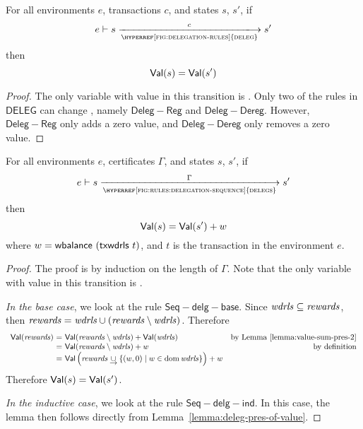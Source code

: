 \begin{lemma}
  \label{lemma:deleg-pres-of-value}
  For all environments $e$, transactions $c$, and states $s$, $s'$, if
  \begin{equation*}
    e\vdash s\trans{\hyperref[fig:delegation-rules]{deleg}}{c}s'
  \end{equation*}
  then
  \begin{equation*}
    \mathsf{Val}(s) = \mathsf{Val}(s')
  \end{equation*}
\end{lemma}

\begin{proof}
  The only variable with value in this transition is .
  Only two of the rules in $\mathsf{DELEG}$ can change ,
  namely $\mathsf{Deleg{-}Reg}$ and $\mathsf{Deleg{-}Dereg}$.
  However, $\mathsf{Deleg{-}Reg}$ only adds a zero value,
  and $\mathsf{Deleg{-}Dereg}$ only removes a zero value.
\end{proof}

\begin{lemma}
  \label{lemma:delegs-pres-of-value}
  For all environments $e$, certificates $\Gamma$, and states $s$, $s'$, if
  \begin{equation*}
    e\vdash s\trans{\hyperref[fig:rules:delegation-sequence]{delegs}}{\Gamma}s'
  \end{equation*}
  then
  \begin{equation*}
    \mathsf{Val}(s) = \mathsf{Val}(s') + w
  \end{equation*}
  where $w = \mathsf{wbalance}~(\mathsf{txwdrls}~{t})$,
  and $t$ is the transaction in the environment $e$.
\end{lemma}

\begin{proof}
  The proof is by induction on the length of $\Gamma$.
  Note that the only variable with value in this transition is .

  \vspace{2ex}
  \noindent
  \emph{In the base case}, we look at the rule $\mathsf{Seq{-}delg{-}base}$.
  Since $\mathit{wdrls}\subseteq\mathit{rewards}$, then
  $\mathit{rewards} = \mathit{wdrls}\cup\mathit{(\mathit{rewards}\setminus\mathit{wdrls})}$.
%
  Therefore
  \begin{equation*}
    \begin{array}{r@{~=~}lr}
      \Val{(\var{rewards})}
      & \Val{(\var{rewards}\setminus\var{wdrls})} + \Val{(\var{wdrls})}
      & \text{by Lemma~\ref{lemma:value-sum-pres-2}}
      \\
      & \Val{(\var{rewards}\setminus\var{wdrls})} + w
      & \text{by definition}
      \\
      & \Val\left(\var{rewards}\unionoverrideRight\{(w, 0) \mid w \in \dom \var{wdrls}\}\right) + w
    \end{array}
  \end{equation*}
  Therefore $\mathsf{Val}(s) = \mathsf{Val}(s')$.

  \vspace{2ex}
  \noindent
  \emph{In the inductive case}, we look at the rule $\mathsf{Seq{-}delg{-}ind}$.
  In this case, the lemma then follows directly from Lemma~\ref{lemma:deleg-pres-of-value}.
\end{proof}

